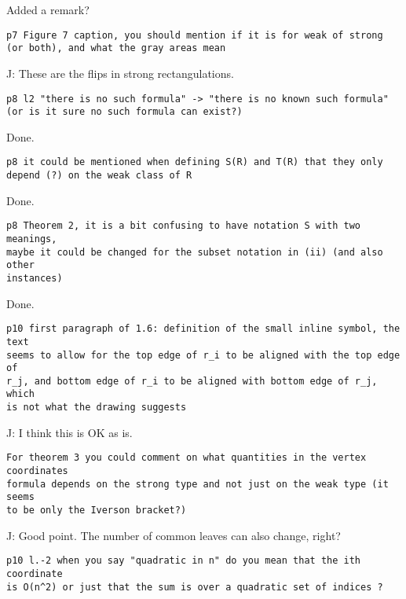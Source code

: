 \documentclass{article}
\begin{document}
Added a remark?

\begin{verbatim}
p7 Figure 7 caption, you should mention if it is for weak of strong 
(or both), and what the gray areas mean
\end{verbatim}

J: These are the flips in strong rectangulations.

\begin{verbatim}
p8 l2 "there is no such formula" -> "there is no known such formula" 
(or is it sure no such formula can exist?)
\end{verbatim}

Done.

\begin{verbatim}
p8 it could be mentioned when defining S(R) and T(R) that they only 
depend (?) on the weak class of R
\end{verbatim}

Done.

\begin{verbatim}
p8 Theorem 2, it is a bit confusing to have notation S with two meanings, 
maybe it could be changed for the subset notation in (ii) (and also other 
instances)
\end{verbatim}

Done.

\begin{verbatim}
p10 first paragraph of 1.6: definition of the small inline symbol, the text 
seems to allow for the top edge of r_i to be aligned with the top edge of 
r_j, and bottom edge of r_i to be aligned with bottom edge of r_j, which 
is not what the drawing suggests
\end{verbatim}

J: I think this is OK as is.

\begin{verbatim}
For theorem 3 you could comment on what quantities in the vertex coordinates 
formula depends on the strong type and not just on the weak type (it seems 
to be only the Iverson bracket?)
\end{verbatim}

J: Good point. The number of common leaves can also change, right?

\begin{verbatim}
p10 l.-2 when you say "quadratic in n" do you mean that the ith coordinate 
is O(n^2) or just that the sum is over a quadratic set of indices ?
\end{verbatim}
\end{document}
